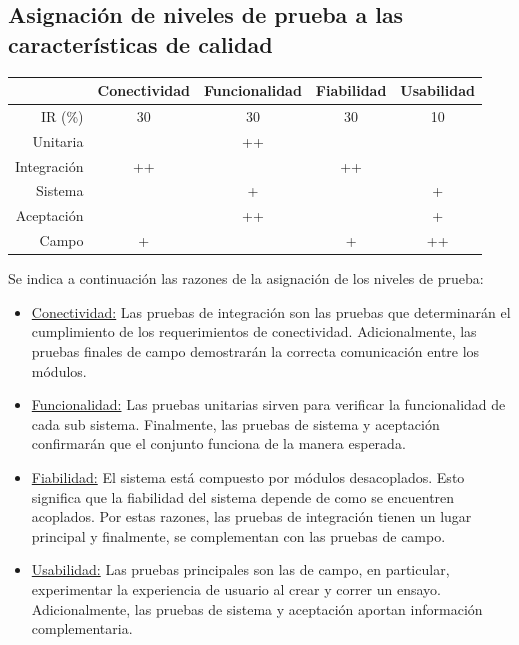 \documentclass[
    11pt,
    spanish,
	a4paper
]{article}
\begin{document}
\subsection{Asignación de niveles de prueba a las características de calidad}
\label{sub:asignacion}

\begin{table}[H]
	\centering
	\begin{tabular}{r|cccc}
        & Conectividad & Funcionalidad & Fiabilidad & Usabilidad \\ \hline
        IR (\%)     & 30 & 30 & 30 & 10 \\
        Unitaria    &    & ++ &    &    \\
        Integración & ++ &    & ++ &    \\
        Sistema     &    & +  &    & +  \\
        Aceptación  &    & ++ &    & +  \\
        Campo       & +  &    & +  & ++ \\
	\end{tabular}
\end{table}

Se indica a continuación las razones de la asignación de los niveles de prueba:

\begin{itemize}
    \item \underline{Conectividad:} Las pruebas de integración son las pruebas que determinarán el cumplimiento de los requerimientos de conectividad.
        Adicionalmente, las pruebas finales de campo demostrarán la correcta comunicación entre los módulos.
    \item \underline{Funcionalidad:} Las pruebas unitarias sirven para verificar la funcionalidad de cada sub sistema.
        Finalmente, las pruebas de sistema y aceptación confirmarán que el conjunto funciona de la manera esperada.
    \item \underline{Fiabilidad:} El sistema está compuesto por módulos desacoplados.
        Esto significa que la fiabilidad del sistema depende de como se encuentren acoplados.
        Por estas razones, las pruebas de integración tienen un lugar principal y finalmente, se complementan con las pruebas de campo.
    \item \underline{Usabilidad:} Las pruebas principales son las de campo, en particular, experimentar la experiencia de usuario al crear y correr un ensayo.
        Adicionalmente, las pruebas de sistema y aceptación aportan información complementaria.
\end{itemize}
\end{document}
